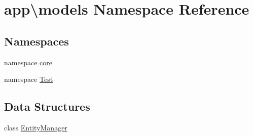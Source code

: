 \hypertarget{namespaceapp_1_1models}{\section{app\textbackslash{}models Namespace Reference}
\label{namespaceapp_1_1models}
}
\subsection*{Namespaces}
\begin{DoxyCompactItemize}
\item 
namespace \hyperlink{namespaceapp_1_1models_1_1core}{core}
\item 
namespace \hyperlink{namespaceapp_1_1models_1_1_test}{Test}
\end{DoxyCompactItemize}
\subsection*{Data Structures}
\begin{DoxyCompactItemize}
\item 
class \hyperlink{classapp_1_1models_1_1_entity_manager}{Entity\-Manager}
\end{DoxyCompactItemize}
